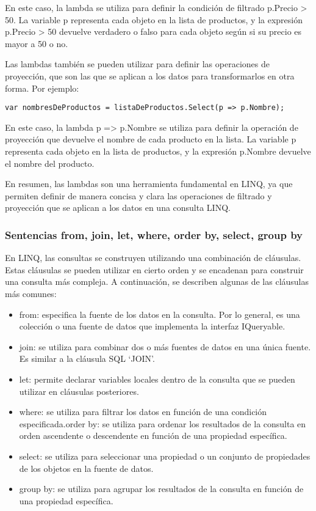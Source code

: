 \documentclass[executivepaper]{article}
\begin{document}
En este caso, la lambda se utiliza para definir la condición de filtrado p.Precio > 50. La variable p representa cada objeto en la lista de productos, y la expresión p.Precio > 50 devuelve verdadero o falso para cada objeto según si su precio es mayor a 50 o no.

Las lambdas también se pueden utilizar para definir las operaciones de proyección, que son las que se aplican a los datos para transformarlos en otra forma. Por ejemplo:

\begin{lstlisting}
var nombresDeProductos = listaDeProductos.Select(p => p.Nombre);
\end{lstlisting}

En este caso, la lambda p => p.Nombre se utiliza para definir la operación de proyección que devuelve el nombre de cada producto en la lista. La variable p representa cada objeto en la lista de productos, y la expresión p.Nombre devuelve el nombre del producto.

En resumen, las lambdas son una herramienta fundamental en LINQ, ya que permiten definir de manera concisa y clara las operaciones de filtrado y proyección que se aplican a los datos en una consulta LINQ.

\subsubsection*{Sentencias from, join, let, where, order by, select, group by}

En LINQ, las consultas se construyen utilizando una combinación de cláusulas. Estas cláusulas se pueden utilizar en cierto orden y se encadenan para construir una consulta más compleja. A continuación, se describen algunas de las cláusulas más comunes:

\begin{itemize}
    \item from: especifica la fuente de los datos en la consulta. Por lo general, es una colección o una fuente de datos que implementa la interfaz IQueryable.
    \item join: se utiliza para combinar dos o más fuentes de datos en una única fuente. Es similar a la cláusula SQL \enquote*{JOIN}.
    \item let: permite declarar variables locales dentro de la consulta que se pueden utilizar en cláusulas posteriores.
    \item where: se utiliza para filtrar los datos en función de una condición especificada.order by: se utiliza para ordenar los resultados de la consulta en orden ascendente o descendente en función de una propiedad específica.
    \item select: se utiliza para seleccionar una propiedad o un conjunto de propiedades de los objetos en la fuente de datos.
    \item group by: se utiliza para agrupar los resultados de la consulta en función de una propiedad específica.
\end{itemize}
\end{document}
